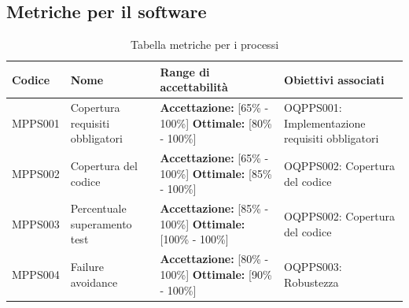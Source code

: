 \documentclass[openany,12pt,a4paper]{report}
\begin{document}
	
	\subsection{Metriche per il software}
	
	\begin{longtable}{| p{2cm} | p{3.5cm} |p{5.5cm} | p{5.5cm} |}
		\caption {Tabella metriche per i processi} \label{tab:title} \\
		\hline
		\textbf{Codice} & \textbf{Nome} & \textbf{Range di accettabilità} & \textbf{Obiettivi associati}\\
		\hline
		\endhead
		
		\newline MPPS001 &
		\newline Copertura requisiti obbligatori &
		\newline \textbf{Accettazione:} [65\% - 100\%]
		\newline \textbf{Ottimale:} [80\% - 100\%] &
		\newline OQPPS001: Implementazione requisiti obbligatori
		\\[1em]
		
		\hline
		
		\newline MPPS002 &
		\newline Copertura del codice &
		\newline \textbf{Accettazione:} [65\% - 100\%]
		\newline \textbf{Ottimale:} [85\% - 100\%] &
		\newline OQPPS002: Copertura del codice
		\\[1em]
		
		\hline
		
		\newline MPPS003 &
		\newline Percentuale superamento test &
		\newline \textbf{Accettazione:} [85\% - 100\%] 
		\newline \textbf{Ottimale:} [100\% - 100\%] &
		\newline OQPPS002: Copertura del codice
		\\[1em]
		
		\hline
		
		\newline MPPS004 &
		\newline Failure avoidance &
		\newline \textbf{Accettazione:} [80\% - 100\%] 
		\newline \textbf{Ottimale:} [90\% - 100\%] &
		\newline OQPPS003: Robustezza
		\\[1em]
		

\end{longtable}
\end{document}
